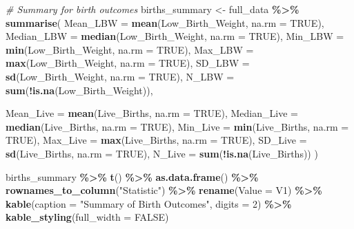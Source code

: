 \documentclass[
]{article}
\newenvironment{Shaded}{\begin{snugshade}}{\end{snugshade}}
\newcommand{\AttributeTok}[1]{\textcolor[rgb]{0.13,0.29,0.53}{#1}}
\newcommand{\CommentTok}[1]{\textcolor[rgb]{0.56,0.35,0.01}{\textit{#1}}}
\newcommand{\ConstantTok}[1]{\textcolor[rgb]{0.56,0.35,0.01}{#1}}
\newcommand{\DecValTok}[1]{\textcolor[rgb]{0.00,0.00,0.81}{#1}}
\newcommand{\FunctionTok}[1]{\textcolor[rgb]{0.13,0.29,0.53}{\textbf{#1}}}
\newcommand{\NormalTok}[1]{#1}
\newcommand{\OtherTok}[1]{\textcolor[rgb]{0.56,0.35,0.01}{#1}}
\newcommand{\SpecialCharTok}[1]{\textcolor[rgb]{0.81,0.36,0.00}{\textbf{#1}}}
\newcommand{\StringTok}[1]{\textcolor[rgb]{0.31,0.60,0.02}{#1}}
\begin{document}
\begin{Shaded}
\begin{Highlighting}[]
\CommentTok{\# Summary for birth outcomes}
\NormalTok{births\_summary }\OtherTok{\textless{}{-}}\NormalTok{ full\_data }\SpecialCharTok{\%\textgreater{}\%}
  \FunctionTok{summarise}\NormalTok{(}
    \AttributeTok{Mean\_LBW       =} \FunctionTok{mean}\NormalTok{(Low\_Birth\_Weight, }\AttributeTok{na.rm =} \ConstantTok{TRUE}\NormalTok{),}
    \AttributeTok{Median\_LBW     =} \FunctionTok{median}\NormalTok{(Low\_Birth\_Weight, }\AttributeTok{na.rm =} \ConstantTok{TRUE}\NormalTok{),}
    \AttributeTok{Min\_LBW        =} \FunctionTok{min}\NormalTok{(Low\_Birth\_Weight, }\AttributeTok{na.rm =} \ConstantTok{TRUE}\NormalTok{),}
    \AttributeTok{Max\_LBW        =} \FunctionTok{max}\NormalTok{(Low\_Birth\_Weight, }\AttributeTok{na.rm =} \ConstantTok{TRUE}\NormalTok{),}
    \AttributeTok{SD\_LBW         =} \FunctionTok{sd}\NormalTok{(Low\_Birth\_Weight, }\AttributeTok{na.rm =} \ConstantTok{TRUE}\NormalTok{),}
    \AttributeTok{N\_LBW          =} \FunctionTok{sum}\NormalTok{(}\SpecialCharTok{!}\FunctionTok{is.na}\NormalTok{(Low\_Birth\_Weight)),}
    
    \AttributeTok{Mean\_Live      =} \FunctionTok{mean}\NormalTok{(Live\_Births, }\AttributeTok{na.rm =} \ConstantTok{TRUE}\NormalTok{),}
    \AttributeTok{Median\_Live    =} \FunctionTok{median}\NormalTok{(Live\_Births, }\AttributeTok{na.rm =} \ConstantTok{TRUE}\NormalTok{),}
    \AttributeTok{Min\_Live       =} \FunctionTok{min}\NormalTok{(Live\_Births, }\AttributeTok{na.rm =} \ConstantTok{TRUE}\NormalTok{),}
    \AttributeTok{Max\_Live       =} \FunctionTok{max}\NormalTok{(Live\_Births, }\AttributeTok{na.rm =} \ConstantTok{TRUE}\NormalTok{),}
    \AttributeTok{SD\_Live        =} \FunctionTok{sd}\NormalTok{(Live\_Births, }\AttributeTok{na.rm =} \ConstantTok{TRUE}\NormalTok{),}
    \AttributeTok{N\_Live         =} \FunctionTok{sum}\NormalTok{(}\SpecialCharTok{!}\FunctionTok{is.na}\NormalTok{(Live\_Births))}
\NormalTok{  )}

\NormalTok{births\_summary }\SpecialCharTok{\%\textgreater{}\%}
  \FunctionTok{t}\NormalTok{() }\SpecialCharTok{\%\textgreater{}\%} \FunctionTok{as.data.frame}\NormalTok{() }\SpecialCharTok{\%\textgreater{}\%}
  \FunctionTok{rownames\_to\_column}\NormalTok{(}\StringTok{"Statistic"}\NormalTok{) }\SpecialCharTok{\%\textgreater{}\%}
  \FunctionTok{rename}\NormalTok{(}\AttributeTok{Value =}\NormalTok{ V1) }\SpecialCharTok{\%\textgreater{}\%}
  \FunctionTok{kable}\NormalTok{(}\AttributeTok{caption =} \StringTok{"Summary of Birth Outcomes"}\NormalTok{, }\AttributeTok{digits =} \DecValTok{2}\NormalTok{) }\SpecialCharTok{\%\textgreater{}\%}
  \FunctionTok{kable\_styling}\NormalTok{(}\AttributeTok{full\_width =} \ConstantTok{FALSE}\NormalTok{)}
\end{Highlighting}
\end{Shaded}
\end{document}
